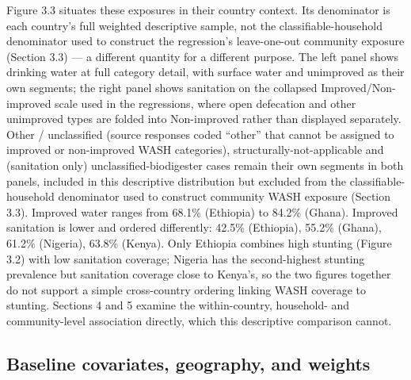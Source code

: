 Figure 3.3 situates these exposures in their country context. Its denominator is each country's full weighted descriptive sample, not the classifiable-household denominator used to construct the regression's leave-one-out community exposure (Section 3.3) --- a different quantity for a different purpose. The left panel shows drinking water at full category detail, with surface water and unimproved as their own segments; the right panel shows sanitation on the collapsed Improved/Non-improved scale used in the regressions, where open defecation and other unimproved types are folded into Non-improved rather than displayed separately. Other / unclassified (source responses coded ``other'' that cannot be assigned to improved or non-improved WASH categories), structurally-not-applicable and (sanitation only) unclassified-biodigester cases remain their own segments in both panels, included in this descriptive distribution but excluded from the classifiable-household denominator used to construct community WASH exposure (Section 3.3). Improved water ranges from 68.1\% (Ethiopia) to 84.2\% (Ghana). Improved sanitation is lower and ordered differently: 42.5\% (Ethiopia), 55.2\% (Ghana), 61.2\% (Nigeria), 63.8\% (Kenya). Only Ethiopia combines high stunting (Figure 3.2) with low sanitation coverage; Nigeria has the second-highest stunting prevalence but sanitation coverage close to Kenya's, so the two figures together do not support a simple cross-country ordering linking WASH coverage to stunting. Sections 4 and 5 examine the within-country, household- and community-level association directly, which this descriptive comparison cannot.

\subsection{Baseline covariates, geography, and weights}\label{sec:3.4}

